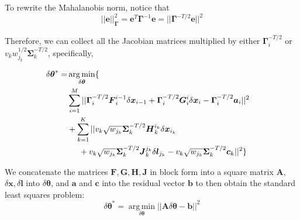 To rewrite the Mahalanobis norm, notice that
\begin{equation}
||\boldsymbol{e}||_{\boldsymbol{\Gamma}}^2 = \boldsymbol{e}^T\boldsymbol{\Gamma}^{-1}\boldsymbol{e} = ||\boldsymbol{\Gamma}^{-T/2}\boldsymbol{e}||^2
\end{equation}

Therefore, we can collect all the Jacobian matrices multiplied by either $\boldsymbol{\Gamma}_i^{-T/2}$ or $v_k w_{j_k}^{1/2}\boldsymbol{\Sigma}_k^{-T/2}$, specifically,

\begin{equation}
\begin{aligned}
\delta \boldsymbol{\theta}^* =& \operatorname*{arg\,min}_{\delta \boldsymbol{\theta}}\{&
\\ &\sum_{i=1}^M||\boldsymbol{\Gamma}_i^{-T/2}\boldsymbol{F}_i^{i-1}\delta \boldsymbol{x}_{i-1} + \boldsymbol{\Gamma}_i^{-T/2} \boldsymbol{G}_i^i\delta \boldsymbol{x}_i - \boldsymbol{\Gamma}_i^{-T/2}\boldsymbol{a}_i||^2  \\
&+\sum_{k=1}^K||v_k\sqrt{w_{j_k}}\boldsymbol{\Sigma}_k^{-T/2} \boldsymbol{H}_k^{i_k}\delta \boldsymbol{x}_{i_k} 
\\ &\hspace{0.5cm}+ v_k\sqrt{w_{j_k}}\boldsymbol{\Sigma}_k^{-T/2}\boldsymbol{J}_k^{j_k}\delta \boldsymbol{l}_{j_k} 
- v_k\sqrt{w_{j_k}}\boldsymbol{\Sigma}_k^{-T/2}\boldsymbol{c}_k||^2\}
\end{aligned}
\end{equation}

We concatenate the matrices $\boldsymbol{F}, \boldsymbol{G}, \boldsymbol{H}, \boldsymbol{J}$ in block form into a square matrix $\boldsymbol{A}$, $\delta \boldsymbol{x}, \delta \boldsymbol{l}$ into $\delta \boldsymbol{\theta}$, and $\boldsymbol{a}$ and $\boldsymbol{c}$ into the residual vector $\boldsymbol{b}$ to then obtain the standard least squares problem:
\begin{equation}
\delta \boldsymbol{\theta}^* = \operatorname*{arg\,min}_{\delta \boldsymbol{\theta}}||\boldsymbol{A}\delta \boldsymbol{\theta} - \boldsymbol{b}||^2
\end{equation}
